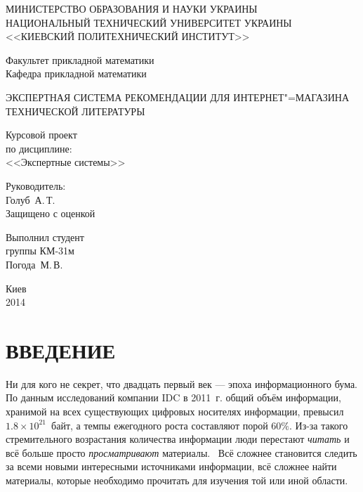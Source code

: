 \documentclass[simple,14pt,utf8,russian]{eskdtext}
\begin{document}
\begin{titlepage}
    \begin{center}
        \MakeUppercase{Министерство образования и науки Украины}\\
        \MakeUppercase{Национальный технический университет Украины}\\
        \MakeUppercase{<<Киевский политехнический институт>>}\\
        \vspace*{2em}

        Факультет прикладной математики\\
        Кафедра прикладной математики

        \vfill

        \MakeUppercase{Экспертная система рекомендации для интернет"=магазина технической литературы}\\
        \vspace*{2em}

        Курсовой проект\\
        по дисциплине:\\
        <<Экспертные системы>>
    \end{center}

    \vfill
    \begin{minipage}{0.6\textwidth}
        Руководитель:\\
        Голуб~А.\,Т.\\
        Защищено с оценкой~\underline{\hspace{5em}}
    \end{minipage}
    \hfill\begin{minipage}{0.3\textwidth}
        Выполнил студент\\
        группы КМ-31м\\
        Погода~М.\,В.
    \end{minipage}

    \vfill
    \begin{center}
        Киев\\
        2014
    \end{center}
\end{titlepage}

\tableofcontents
\clearpage
\section*{ВВЕДЕНИЕ}
\label{chap:intro}
    Ни для кого не секрет, что двадцать первый век ---  эпоха информационного бума.
    По данным исследований компании IDC в 2011~г. общий объём информации, хранимой на всех существующих цифровых
    носителях информации, превысил $1.8 \times 10^{21}$~байт, а темпы ежегодного роста составляют порой $60\%$.
    Из-за такого стремительного возрастания количества информации люди перестают \textit{читать} и всё больше просто
    \textit{просматривают} материалы.~\cite{book1}
    Всё сложнее становится следить за всеми новыми интересными источниками информации, всё сложнее найти материалы,
    которые необходимо прочитать для изучения той или иной области.
\end{document}
